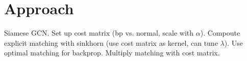\section{Approach}

Siamese GCN.
Set up cost matrix (bp vs. normal, scale with $\alpha$).
Compoute explicit matching with sinkhorn (use cost matrix as kernel, can tune $\lambda$).
Use optimal matching for backprop.
Multiply matching with cost matrix.


